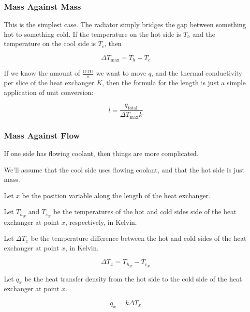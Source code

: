 \documentclass{article}
\numberwithin{equation}{subsection}
\theoremstyle{remark}
\newcommand{\qtotal}{q_{\mathrm{total}}}
\newcommand{\DeltaT}{\Delta{}T}
\newcommand{\DeltaTmax}{\DeltaT_{\mathrm{max}}}
\begin{document}
\subsubsection{Mass Against Mass}

This is the simplest case.
The radiator simply bridges the gap between something hot to something cold.
If the temperature on the hot side is \(T_{h}\) and the temperature on the cool side is \(T_{c}\), then

\begin{equation}
\DeltaTmax = T_{h} - T_{c}
\end{equation}

If we know the amount of \(\frac{\mathrm{DTU}}{\mathrm{s}}\) we want to move \(q\), and the thermal conductivity per slice of the heat exchanger \(K\), then the formula for the length is just a simple application of unit conversion:

\begin{equation}
l = \frac{\qtotal}{\DeltaTmax k}
\end{equation}

\subsubsection{Mass Against Flow}

If one side has flowing coolant, then things are more complicated.

We'll assume that the cool side uses flowing coolant, and that the hot side is just mass.

Let \(x\) be the position variable along the length of the heat exchanger.

Let \({T_{h}}_{x}\) and \({T_{c}}_{x}\) be the temperatures of the hot and cold sides side of the heat exchanger at point \(x\), respectively, in Kelvin.

Let \(\DeltaT_{x}\) be the temperature difference between the hot and cold sides of the heat exchanger at point \(x\), in Kelvin.

\begin{equation}
\DeltaT_{x} = {T_{h}}_{x} - {T_{c}}_{x}
\end{equation}

Let \(q_{x}\) be the heat transfer density from the hot side to the cold side of the heat exchanger at point \(x\).

\begin{equation}
q_{x} = k \DeltaT_{x}
\end{equation}
\end{document}
